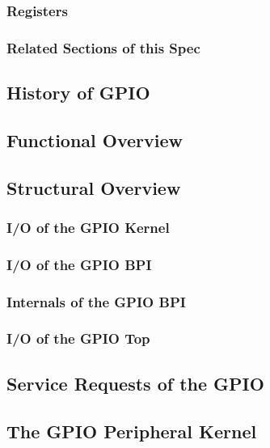 \subsubsection{Registers}

\subsubsection{Related Sections of this Spec}

\subsection{History of GPIO}

\subsection{Functional Overview}
\label{subsec:gpiofunc01}

\subsection{Structural Overview}



\subsubsection{I/O of the GPIO Kernel}

\subsubsection{I/O of the GPIO BPI}

\subsubsection{Internals of the GPIO BPI}

\subsubsection{I/O of the GPIO Top}

\subsection{Service Requests of the GPIO}

\subsection{The GPIO Peripheral Kernel}
\label{subsec:gpiofunc02}


